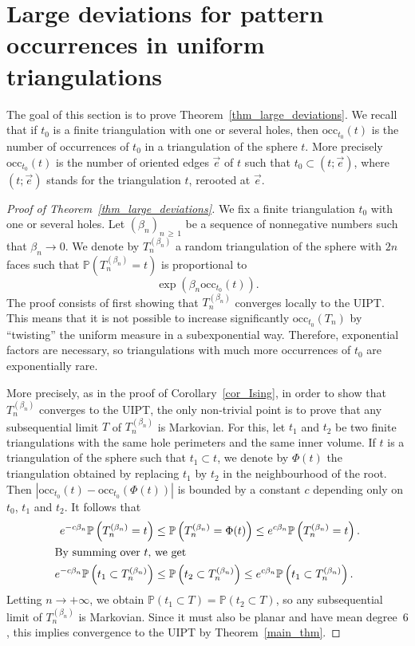 \documentclass[AHL,Unicode,longabstracts,published]{cedram}
\renewcommand{\P}{\mathbb{P}}
\newcommand{\occ}{\mathrm{occ}}
\begin{document}
\section{Large deviations for pattern occurrences in uniform triangulations}

The goal of this section is to prove Theorem~\ref{thm_large_deviations}. We recall that if $t_0$ is a finite triangulation with one or several holes, then $\occ_{t_0}(t)$ is the number of occurrences of $t_0$ in a triangulation of the sphere $t$. More precisely $\occ_{t_0}(t)$ is the number of oriented edges $\vec{e}$ of $t$ such that $t_0 \subset (t;\vec{e})$, where $(t;\vec{e})$ stands for the triangulation $t$, rerooted at $\vec{e}$.

\begin{proof}[Proof of Theorem~\ref{thm_large_deviations}]
We fix a finite triangulation $t_0$ with one or several holes. Let $(\beta_n)_{n\,\geq\,1}$ be a sequence of nonnegative numbers such that $\beta_n \to 0$. We denote by $T_n^{(\beta_n)}$ a random triangulation of the sphere with $2n$ faces such that $\P (T_n^{(\beta_n)}=t)$ is proportional to
\[
\exp \left(\beta_n \occ_{t_0}(t) \right).
\]
The proof consists of first showing that $T_n^{(\beta_n)}$ converges locally to the UIPT. This means that it is not possible to increase significantly $\occ_{t_0}(T_n)$ by ``twisting'' the uniform measure in a subexponential way. Therefore, exponential factors are necessary, so triangulations with much more occurrences of $t_0$ are exponentially rare.

More precisely, as in the proof of Corollary~\ref{cor_Ising}, in order to show that $T_n^{(\beta_n)}$ converges to the UIPT, the only non-trivial point is to prove that any subsequential limit $T$ of $T_n^{(\beta_n)}$ is Markovian. For this, let $t_1$ and $t_2$ be two finite triangulations with the same hole perimeters and the same inner volume. If $t$ is a triangulation of the sphere such that $t_1 \subset t$, we denote by $\Phi(t)$ the triangulation obtained by replacing $t_1$ by $t_2$ in the neighbourhood of the root. Then $|\occ_{t_0}(t)-\occ_{t_0}(\Phi(t))|$ is bounded by a constant $c$ depending only on $t_0$, $t_1$ and $t_2$. It follows that
\begin{align*}
e^{-c \beta_n} \P \left(T_n^{(\beta_n)}=t \right) &\leq \P \left(T_n^{(\beta_n)}=\Phi(t) \right) \leq e^{c \beta_n} \P \left(T_n^{(\beta_n)}=t \right).
\\
\intertext{By summing over $t$, we get}
e^{-c \beta_n} \P \left(t_1 \subset T_n^{(\beta_n)} \right) &\leq \P \left(t_2 \subset T_n^{(\beta_n)} \right) \leq e^{c \beta_n} \P \left(t_1 \subset T_n^{(\beta_n)} \right).
\end{align*}
Letting $n \to +\infty$, we obtain $\P (t_1 \subset T )=\P (t_2 \subset T )$, so any subsequential limit of $T_n^{(\beta_n)}$ is Markovian. Since it must also be planar and have mean degree~$6$, this implies convergence to the UIPT by Theorem~\ref{main_thm}.


\end{proof}
\end{document}
